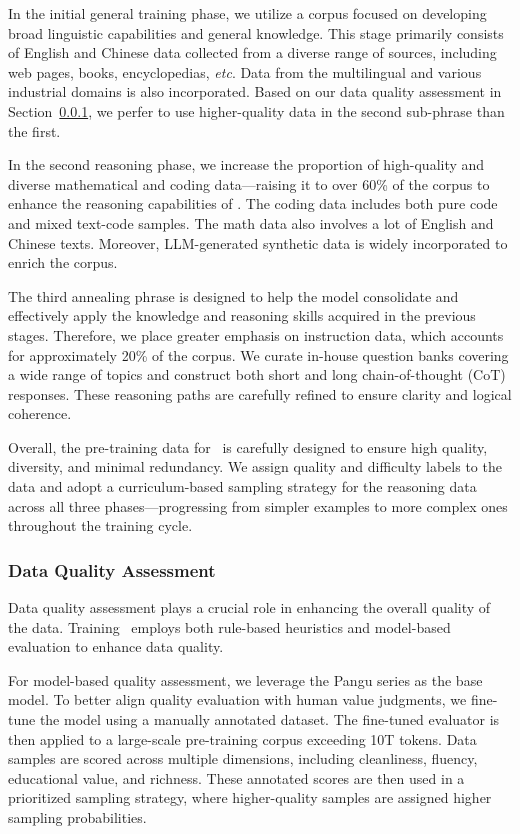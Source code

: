 In the initial general training phase, we utilize a corpus focused on developing broad linguistic capabilities and general knowledge. 
This stage primarily consists of English and Chinese data collected from a diverse range of sources, including web pages, books, encyclopedias, \textit{etc}.
Data from the multilingual and various industrial domains is also incorporated. Based on our data quality assessment in Section~\ref{sec:data_quality}, we perfer to use higher-quality data in the second sub-phrase than the first.

In the second reasoning phase, we increase the proportion of high-quality and diverse mathematical and coding data---raising it to over 60\% of the corpus to enhance the reasoning capabilities of \modelname. 
The coding data includes both pure code and mixed text-code samples. The math data also involves a lot of English and Chinese texts.
Moreover, LLM-generated synthetic data is widely incorporated to enrich the corpus.


The third annealing phrase is designed to help the model consolidate and effectively apply the knowledge and reasoning skills acquired in the previous stages. 
Therefore, we place greater emphasis on instruction data, which accounts for approximately 20\% of the corpus. 
We curate in-house question banks covering a wide range of topics and construct both short and long chain-of-thought (CoT) responses. 
These reasoning paths are carefully refined to ensure clarity and logical coherence.

Overall, the pre-training data for \modelname~is carefully designed to ensure high quality, diversity, and minimal redundancy. 
We assign quality and difficulty labels to the data and adopt a curriculum-based sampling strategy for the reasoning data across all three phases---progressing from simpler examples to more complex ones throughout the training cycle.



\subsubsection{Data Quality Assessment}
\label{sec:data_quality}

Data quality assessment plays a crucial role in enhancing the overall quality of the data. 
Training \modelname~employs both rule-based heuristics and model-based evaluation to enhance data quality.

For model-based quality assessment, we leverage the Pangu series as the base model. To better align quality evaluation with human value judgments, we fine-tune the model using a manually annotated dataset. The fine-tuned evaluator is then applied to a large-scale pre-training corpus exceeding 10T tokens. Data samples are scored across multiple dimensions, including cleanliness, fluency, educational value, and richness. These annotated scores are then used in a prioritized sampling strategy, where higher-quality samples are assigned higher sampling probabilities.


